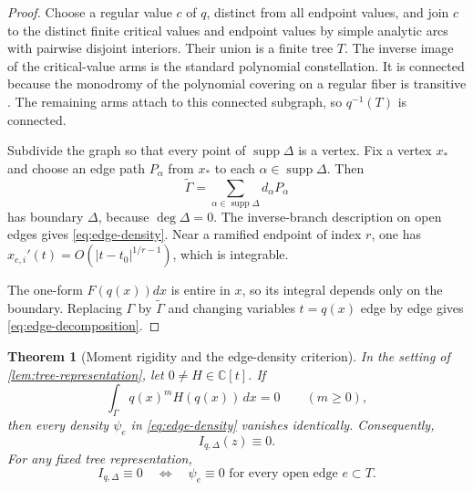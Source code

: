 \documentclass[11pt]{article}
\numberwithin{equation}{section}
\newtheorem{theorem}{Theorem}[section]
\theoremstyle{definition}
\theoremstyle{remark}
\newcommand{\C}{\mathbb C}
\newcommand{\supp}{\operatorname{supp}}
\begin{document}
\begin{proof}
Choose a regular value $c$ of $q$, distinct from all endpoint values, and
join $c$ to the distinct finite critical values and endpoint values by
simple analytic arcs with pairwise disjoint interiors.  Their union is a
finite tree $T$.  The inverse image of the critical-value arms is the
standard polynomial constellation.  It is connected because the monodromy
of the polynomial covering on a regular fiber is transitive
\cite[\S2.1]{PakovichMuzychuk}.  The remaining arms attach to this connected
subgraph, so $q^{-1}(T)$ is connected.

Subdivide the graph so that every point of $\supp\Delta$ is a vertex.  Fix
a vertex $x_*$ and choose an edge path $P_\alpha$ from $x_*$ to each
$\alpha\in\supp\Delta$.  Then
\[
  \widetilde\Gamma=
  \sum_{\alpha\in\supp\Delta}d_\alpha P_\alpha
\]
has boundary $\Delta$, because $\deg\Delta=0$.  The inverse-branch
description on open edges gives \eqref{eq:edge-density}.  Near a ramified
endpoint of index $r$, one has
$x_{e,i}'(t)=O(|t-t_0|^{1/r-1})$, which is integrable.

The one-form $F(q(x))dx$ is entire in $x$, so its integral depends only on
the boundary.  Replacing $\Gamma$ by $\widetilde\Gamma$ and changing
variables $t=q(x)$ edge by edge gives \eqref{eq:edge-decomposition}.
\end{proof}

\begin{theorem}[Moment rigidity and the edge-density criterion]
\label{thm:moment-rigidity}
In the setting of \cref{lem:tree-representation}, let
$0\ne H\in\C[t]$.  If
\begin{equation}\label{eq:moments}
  \int_\Gamma q(x)^mH(q(x))\,dx=0
  \qquad(m\ge0),
\end{equation}
then every density $\psi_e$ in \eqref{eq:edge-density} vanishes
identically.  Consequently,
\[
  I_{q,\Delta}(z)\equiv0.
\]
For any fixed tree representation,
\begin{equation}\label{eq:edge-criterion}
  I_{q,\Delta}\equiv0
  \quad\Longleftrightarrow\quad
  \psi_e\equiv0\text{ for every open edge }e\subset T.
\end{equation}
\end{theorem}
\end{document}
